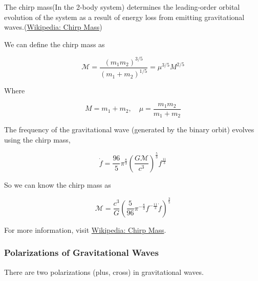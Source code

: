 The chirp mass(In the 2-body system) determines the leading-order orbital evolution of the system as a result of energy loss from emitting gravitational waves.(\href{https://en.wikipedia.org/wiki/Chirp_mass}{Wikipedia: Chirp Mass})

We can define the chirp mass as

\begin{equation}
    \mathcal{M} = \frac{(m_1 m_2)^{3/5}}{(m_1 + m_2)^{1/5}} = \mu^{3/5} M^{2/5}
\end{equation}

Where

\begin{equation}
    M = m_1 + m_2, \quad \mu = \frac{m_1 m_2}{m_1 + m_2}
\end{equation}

The frequency of the gravitational wave (generated by the binary orbit) evolves using the chirp mass,

\begin{equation}
    \dot{f} = \frac{96}{5} \pi^{\frac{8}{3}} \left( \frac{G \mathcal{M}}{c^3} \right)^{\frac{5}{3}} f^{\frac{11}{3}}
\end{equation}

So we can know the chirp mass as

\begin{equation}
    \mathcal{M} = \frac{c^3}{G} \left( \frac{5}{96} \pi^{-\frac{8}{3}} f^{-\frac{11}{3}} \dot{f} \right)^{\frac{3}{5}}
\end{equation}

For more information, visit \href{https://en.wikipedia.org/wiki/Chirp_mass}{Wikipedia: Chirp Mass}.

\subsubsection{Polarizations of Gravitational Waves}

There are two polarizations (plus, cross) in gravitational waves.

